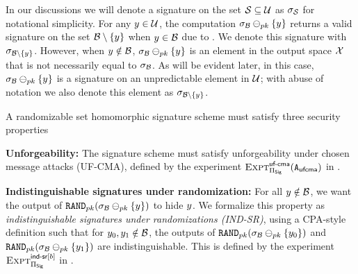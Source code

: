 \begin{remark}
In our discussions we will denote a signature on the set $\genericSetVar \subseteq\universe$ as $\genericSig[\genericSetVar]$ for notational simplicity. For any $\genericCInputElmt \in \universe$, the computation $\genericSig[\blocklist] \sigMinus[\pubKey] \{\genericCInputElmt\}$ returns a valid signature on the set $\genericSetDiff[\blocklist][\genericCInputElmt]$ when $\genericCInputElmt \in \blocklist$ due to . We denote this signature with $\genericSig[\genericSetDiff[\blocklist][\genericCInputElmt]]$. 
 However, when $\genericCInputElmt \notin \blocklist$, $\genericSig[\blocklist] \sigMinus[\pubKey] \{\genericCInputElmt\}$ is an element in the output space $\mathcal{X}$ that is not necessarily equal to $\genericSig[\blocklist]$. As will be evident later, in this case, 
$\genericSig[\blocklist] \sigMinus[\pubKey] \{\genericCInputElmt\}$ is a signature on an unpredictable element in $\mathcal{U}$; with abuse of notation we also denote this element as $\genericSig[\genericSetDiff[\blocklist][\genericCInputElmt]]$. 
\end{remark}


%




%
A randomizable set homomorphic signature scheme must satisfy three security properties

\itemListStart
\item \textbf{Unforgeability:} The signature scheme must satisfy unforgeability under chosen message attacks (UF-CMA), defined by the experiment $\Experiment{\ufcmaLabel}{\sigScheme}(\ufcmaAdversary)$ in .  
\item \textbf{Indistinguishable signatures under randomization:}  For all 
$\genericCInputElmt \notin \blocklist$, we want the output of $\randomize[\pubKey](\genericSig[\blocklist] \sigMinus[\pubKey] 
\setDefn{\genericCInputElmt})$ to hide 
$\genericCInputElmt$. We formalize this property as \emph{indistinguishable signatures under randomizations (IND-SR)}, using a CPA-style definition such that for $\genericCInputElmt{0}, \genericCInputElmt{1} \notin \blocklist$,
the outputs of $\randomize[\pubKey](\genericSig[\blocklist]
\sigMinus[\pubKey] \{\genericCInputElmt{0}\})$ and
$\randomize[\pubKey](\genericSig[\blocklist] \sigMinus[\pubKey]
\{\genericCInputElmt{1}\})$ are indistinguishable. This is defined by the experiment $\Experiment{\indsrLabel[\indBit]}{\sigScheme}$ in . 

